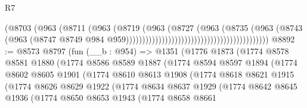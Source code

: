\begin{lexlean}{R7}
\begin{coremodule}
                                                                  (@8703
                                                                    (@963
                                                                      (@8711
                                                                        (@963
                                                                          (@8719
                                                                            (@963
                                                                              (@8727
                                                                                (@963
                                                                                  (@8735
                                                                                    (@963
                                                                                      (@8743
                                                                                        (@963
                                                                                          (@8747
                                                                                            @8749
                                                                                            @984
                                                                                            @959))))))))))))))))))))))))))))))))))))))))))))
@8892 := @8573
    @8797
    (fun (__b : @954) =>
    @1351
      (@1776
        @1873
        (@1774
          @8578
          @8581
          @1880
          (@1774
            @8586
            @8589
            @1887
            (@1774
              @8594
              @8597
              @1894
              (@1774
                @8602
                @8605
                @1901
                (@1774
                  @8610
                  @8613
                  @1908
                  (@1774
                    @8618
                    @8621
                    @1915
                    (@1774
                      @8626
                      @8629
                      @1922
                      (@1774
                        @8634
                        @8637
                        @1929
                        (@1774
                          @8642
                          @8645
                          @1936
                          (@1774
                            @8650
                            @8653
                            @1943
                            (@1774
                              @8658
                              @8661

\end{coremodule}
\end{lexlean}
